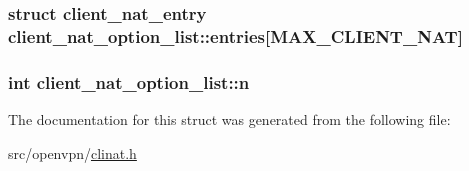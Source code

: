 \subsubsection[{entries}]{\setlength{\rightskip}{0pt plus 5cm}struct {\bf client\+\_\+nat\+\_\+entry} client\+\_\+nat\+\_\+option\+\_\+list\+::entries\mbox{[}{\bf M\+A\+X\+\_\+\+C\+L\+I\+E\+N\+T\+\_\+\+N\+A\+T}\mbox{]}}\label{structclient__nat__option__list_aacb63fefb0d0ee340c43ba988768e71d}
\hypertarget{structclient__nat__option__list_a8c360f0d8dafbb8ad4c9b59983b8a015}{}
\subsubsection[{n}]{\setlength{\rightskip}{0pt plus 5cm}int client\+\_\+nat\+\_\+option\+\_\+list\+::n}\label{structclient__nat__option__list_a8c360f0d8dafbb8ad4c9b59983b8a015}


The documentation for this struct was generated from the following file\+:\begin{DoxyCompactItemize}
\item 
src/openvpn/\hyperlink{clinat_8h}{clinat.\+h}\end{DoxyCompactItemize}

